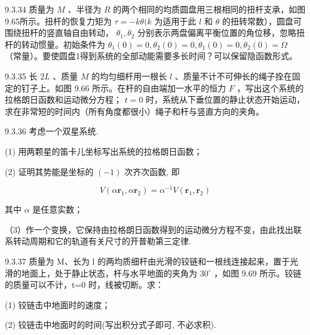 \begin{problem}{9.3.34}
质量为 $M$ 、半径为 $R$ 的两个相同的均质圆盘用三根相同的扭杆支承，如图9.65所示。扭杆的恢复力矩为 $\tau = -k\theta (k$ 为适用于此 $l$ 和 $\theta$ 的扭转常数），圆盘可围绕扭杆的竖直轴自由转动， $\theta_{1}, \theta_{2}$ 分别表示两盘偏离平衡位置的角位移，忽略扭杆的转动惯量。初始条件为 $\theta_{1}(0) = 0, \theta_{2}(0) = 0, \dot{\theta}_{1}(0) = 0, \dot{\theta}_{2}(0) = \Omega$ （常量）。要使圆盘1得到系统的全部动能需要多长时间？可以保留隐函数形式。
\begin{center}

\end{center}
\end{problem}
\clearpage


\begin{problem}{9.3.35}
长 $2L$ 、质量 $M$ 的均匀细杆用一根长 $l$ 、质量不计不可伸长的绳子拴在固定的钉子上。如图 9.66 所示。在杆的自由端加一水平的恒力 $F$ ，写出这个系统的拉格朗日函数和运动微分方程； $t=0$ 时，系统从下垂位置的静止状态开始运动，求在非常短的时间内（所有角度都很小）绳子和杆与竖直方向的夹角。
\begin{center}

\end{center}
\end{problem}
\clearpage


\begin{problem}{9.3.36}
考虑一个双星系统.

(1) 用两颗星的笛卡儿坐标写出系统的拉格朗日函数；

(2) 证明其势能是坐标的 $(-1)$ 次齐次函数, 即

\[
V (\alpha \boldsymbol {r} _ {1}, \alpha \boldsymbol {r} _ {2}) = \alpha^ {- 1} V (\boldsymbol {r} _ {1}, \boldsymbol {r} _ {2})
\]

其中 $\alpha$ 是任意实数；

（3）作一个变换，它保持由拉格朗日函数得到的运动微分方程不变，由此找出联系转动周期和它的轨道有关尺寸的开普勒第三定律.
\begin{center}

\end{center}
\end{problem}
\clearpage


\begin{problem}{9.3.37}
质量为 M、长为 l 的两均质细杆由光滑的铰链和一根线连接起来，置于光滑的地面上，处于静止状态，杆与水平地面的夹角为 $30^{\circ}$ ，如图 9.69 所示。铰链的质量可以不计，t=0 时，线被切断。求：

(1) 铰链击中地面时的速度；

(2) 铰链击中地面时的时间(写出积分式子即可, 不必求积).
\begin{center}

\end{center}
\end{problem}
\clearpage


